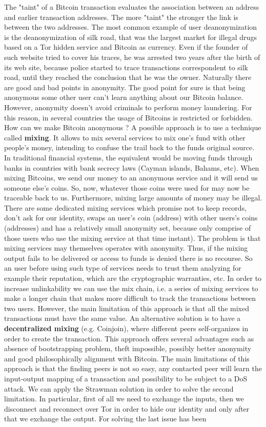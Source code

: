 The "taint" of a Bitcoin transaction evaluates the association between an address and earlier transaction addresses. The more "taint" the stronger the link is between the two addresses. The most common example of user deanonymization is the deanonymization of silk road, that was the largest market for illegal drugs based on a Tor hidden service and Bitcoin as currency. Even if the founder of such website tried to cover his traces, he was arrested two years after the birth of its web site, because police started to trace transactions correspondent to silk road, until they reached the conclusion that he was the owner. Naturally there are good and bad points in anonymity. The good point for sure is that being anonymous some other user can't learn anything about our Bitcoin balance. However, anonymity doesn't avoid criminals to perform money laundering. For this reason, in several countries the usage of Bitcoins is restricted or forbidden. How can we make Bitcoin anonymous ? A possible approach is to use a technique called \textbf{mixing}. It allows to mix several services to mix one's fund with other people's money, intending to confuse the trail back to the funds original source. In traditional financial systems, the equivalent would be moving funds through banks in countries with bank secrecy laws (Cayman islands, Bahams, etc). When mixing Bitcoins, we send our money to an anonymous service and it will send us someone else's coins. So, now, whatever those coins were used for may now be traceable back to us. Furthermore, mixing large amounts of money may be illegal. There are some dedicated mixing services which promise not to keep records, don't ask for our identity, swaps an user's coin (address) with other users's coins (addresses) and has a relatively small anonymity set, because only comprise of those users who use the mixing service at that time instant). The problem is that mixing services may themselves operates with anonymity. Thus, if the mixing output fails to be delivered or access to funds is denied there is no recourse. So an user before using such type of services needs to trust them analyzing for example their reputation, which are the cryptographic warranties, etc. In order to increase unlinkability we can use the mix chain, i.e. a series of mixing services to make a longer chain that makes more difficult to track the transactions between two users. However, the main limitation of this approach is that all the mixed transactions must have the same value. An alternative solution is to have a \textbf{decentralized mixing} (e.g. Coinjoin), where different peers self-organizes in order to create the transaction. This approach offers several advantages such as absence of bootstrapping problem, theft impossible, possibly better anonymity and good philosophically alignment with Bitcoin. The main limitations of this approach is that the finding peers is not so easy, any contacted peer will learn the input-output mapping of a transaction and possibility to be subject to a DoS attack. We can apply the Strawman solution in order to solve the second limitation. In particular, first of all we need to exchange the inputs, then we disconnect and reconnect over Tor in order to hide our identity and only after that we exchange the output. For solving the last issue has been 